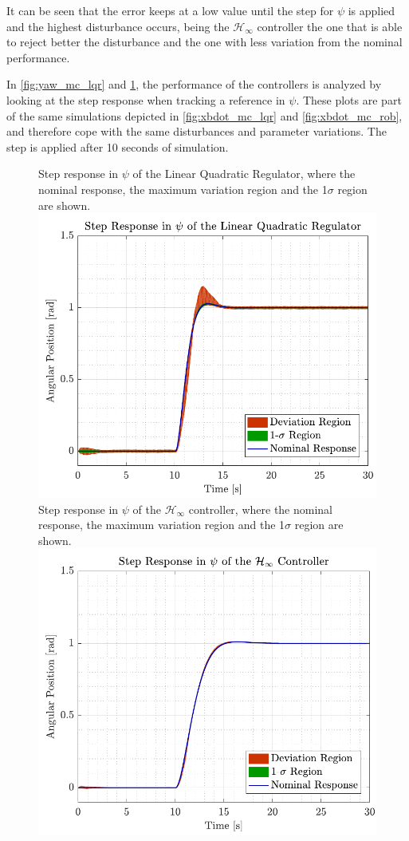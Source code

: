 It can be seen that the error keeps at a low value until the step for $\psi$ is applied and the highest disturbance occurs, being the $\mathcal{H}_\infty$ controller the one that is able to reject better the disturbance and the one with less variation from the nominal performance.

In \autoref{fig:yaw_mc_lqr} and \ref{fig:yaw_mc_rob}, the performance of the controllers is analyzed by looking at the step response when tracking a reference in $\psi$. These plots are part of the same simulations depicted in \autoref{fig:xbdot_mc_lqr} and \ref{fig:xbdot_mc_rob}, and therefore cope with the same disturbances and parameter variations. The step is applied after 10 seconds of simulation.
\begin{figure}[H]
    \captionbox 
    {   
        Step response in $\psi$ of the Linear Quadratic Regulator, where the nominal response, the maximum variation region and the 1$\sigma$ region are shown.
        \label{fig:yaw_mc_lqr}
    }                                                                 
    {                                                                  
        \includegraphics[width=.45\textwidth]{figures/yaw_mc_lqr}         
    }                                                                    
    \hspace{5pt}                                                          
    \captionbox  
    {   
        Step response in $\psi$ of the $\mathcal{H}_\infty$ controller, where the nominal response, the maximum variation region and the 1$\sigma$ region are shown.   
        \label{fig:yaw_mc_rob}
    }                                                                          
    {
        \includegraphics[width=.45\textwidth]{figures/yaw_mc_rob}
    }
\end{figure}

